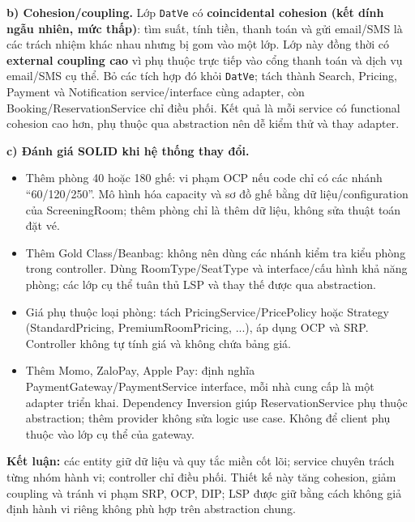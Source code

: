 \documentclass[11pt,a4paper]{article}
\begin{document}
\textbf{b) Cohesion/coupling.} Lớp \texttt{DatVe} có \textbf{coincidental cohesion (kết dính ngẫu nhiên, mức thấp)}: tìm suất, tính tiền, thanh toán và gửi email/SMS là các trách nhiệm khác nhau nhưng bị gom vào một lớp. Lớp này đồng thời có \textbf{external coupling cao} vì phụ thuộc trực tiếp vào cổng thanh toán và dịch vụ email/SMS cụ thể. Bỏ các tích hợp đó khỏi \texttt{DatVe}; tách thành Search, Pricing, Payment và Notification service/interface cùng adapter, còn Booking/ReservationService chỉ điều phối. Kết quả là mỗi service có functional cohesion cao hơn, phụ thuộc qua abstraction nên dễ kiểm thử và thay adapter.

\textbf{c) Đánh giá SOLID khi hệ thống thay đổi.}
\begin{itemize}[leftmargin=1.05cm,itemsep=1pt]
  \item Thêm phòng 40 hoặc 180 ghế: vi phạm OCP nếu code chỉ có các nhánh ``60/120/250''. Mô hình hóa capacity và sơ đồ ghế bằng dữ liệu/configuration của ScreeningRoom; thêm phòng chỉ là thêm dữ liệu, không sửa thuật toán đặt vé.
  \item Thêm Gold Class/Beanbag: không nên dùng các nhánh kiểm tra kiểu phòng trong controller. Dùng RoomType/SeatType và interface/cấu hình khả năng phòng; các lớp cụ thể tuân thủ LSP và thay thế được qua abstraction.
  \item Giá phụ thuộc loại phòng: tách PricingService/PricePolicy hoặc Strategy (StandardPricing, PremiumRoomPricing, ...), áp dụng OCP và SRP. Controller không tự tính giá và không chứa bảng giá.
  \item Thêm Momo, ZaloPay, Apple Pay: định nghĩa PaymentGateway/PaymentService interface, mỗi nhà cung cấp là một adapter triển khai. Dependency Inversion giúp ReservationService phụ thuộc abstraction; thêm provider không sửa logic use case. Không để client phụ thuộc vào lớp cụ thể của gateway.
\end{itemize}

\textbf{Kết luận:} các entity giữ dữ liệu và quy tắc miền cốt lõi; service chuyên trách từng nhóm hành vi; controller chỉ điều phối. Thiết kế này tăng cohesion, giảm coupling và tránh vi phạm SRP, OCP, DIP; LSP được giữ bằng cách không giả định hành vi riêng không phù hợp trên abstraction chung.
\end{document}
